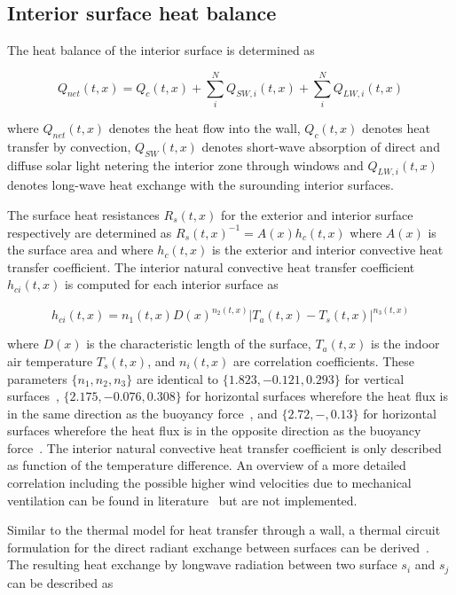 \subsection{Interior surface heat balance}
\label{sec:int}

The heat balance of the interior surface is determined as 

\begin{equation} \label{eq:intersurf}
Q_{net}(t,x) = Q_{c}(t,x) + \sum_{i}^{N} Q_{SW,i}(t,x) + \sum_{i}^{N} Q_{LW,i}(t,x)
\end{equation}


where $Q_{net}(t,x)$ denotes the heat flow into the wall, $Q_{c}(t,x)$ denotes heat transfer by convection, $Q_{SW}(t,x)$ denotes short-wave absorption of direct and diffuse solar light netering the interior zone through windows and  $Q_{LW,i}(t,x)$ denotes long-wave heat exchange with the surounding interior surfaces.

 The surface heat resistances $R_{s}(t,x)$ for the exterior and interior surface respectively are determined as $R_{s}(t,x)^{-1}=A(x)h_{c}(t,x)$ where $A(x)$ is the surface area and where $h_{c}(t,x)$ is the exterior and interior convective heat transfer coefficient. The interior natural convective heat transfer coefficient $h_{ci}(t,x)$ is computed for each interior surface as

\begin{equation}
h_{ci}(t,x) = n_{1}(t,x) D(x)^{n_{2}(t,x)} \left|T_{a}(t,x)-T_{s}(t,x)\right|^{n_{3}(t,x)}
\end{equation}

where $D(x)$ is the characteristic length of the surface, $T_{a}(t,x)$ is the indoor air temperature $T_{s}(t,x)$, and $n_{i}(t,x)$ are correlation coefficients. These parameters $\{n_{1},n_{2},n_{3}\}$ are identical to $\{1.823,-0.121,0.293\}$ for vertical surfaces~\cite{Khalifa2001}, $\{2.175,-0.076,0.308\}$ for horizontal surfaces wherefore the heat flux is in the same direction as the buoyancy force~\cite{Khalifa2001}, and $\{2.72,-,0.13\}$ for horizontal surfaces wherefore the heat flux is in the opposite direction as the buoyancy force~\cite{Awbi1999}. The interior natural convective heat transfer coefficient is only described as function of the temperature difference. An overview of a more detailed correlation including the possible higher wind velocities due to mechanical ventilation can be found in literature~\cite{Beausoleil-Morrison2000} but are not implemented.

 Similar to the thermal model for heat transfer through a wall, a thermal circuit formulation for the direct radiant exchange between surfaces can be derived~\cite{Buchberg1954,Buchberg1955,Oppenheim1956}. The resulting heat exchange by longwave radiation between two surface $s_{i}$ and $s_{j}$ can be described as

